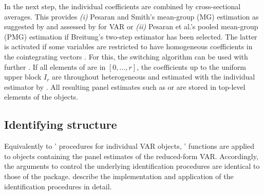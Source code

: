 In the next step, the individual coefficients are combined by cross-sectional averages. This provides \textit{(i)} Pesaran and Smith's \citeyearpar{PesaranSmith1995} mean-group (MG) estimation as suggested by \citet{CanovaCiccarelli2013} and assessed by \citet{Rebucci2010} for VAR or \textit{(ii)} Pesaran et al.'s \citeyearpar{PesaranEtAl1999} pooled mean-group (PMG) estimation if Breitung's \citeyearpar{Breitung2005} two-step estimator has been selected. The latter is activated if some variables  are restricted to have homogeneous coefficients in the  cointegrating vectors . For this, the switching algorithm can be used with further . If all elements of  are in $ \left[0, \ldots , r \right] $, the coefficients up to the uniform upper block $ I_{r} $ are throughout heterogeneous and estimated with the individual estimator by \citet{AhnReisel1990}. All resulting panel estimates such as  or  are stored in top-level elements of the  objects. 



\subsection{Identifying structure} \label{sec:pid}
Equivalently to '  procedures for individual VAR objects, '  functions are applied to  objects containing the panel estimates of the reduced-form VAR. Accordingly, the arguments to control the underlying identification procedures are identical to those of the  package. \citet{LangeEtAl_fc} describe the implementation and application of the identification procedures in detail. 



